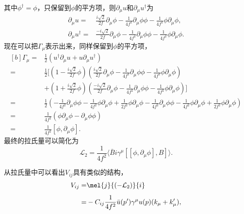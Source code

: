 其中$\phi^{\dagger}=\phi$，只保留到$\phi$的平方项，则$\partial_{\mu}u$和$\partial_{\mu}u^{\dagger}$为
\begin{equation}
\begin{split}
	\partial_{\mu}u=&\frac{i\sqrt{2}}{2f}\partial_{\mu}\phi-\frac{1}{4f^2}\partial_{\mu}\phi\phi-\frac{1}{4f^2}\phi\partial_{\mu}\phi,\\[1ex]
	\partial_{\mu}u^{\dagger}=&\frac{-i\sqrt{2}}{2f}\partial_{\mu}\phi-\frac{1}{4f^2}\partial_{\mu}\phi\phi-\frac{1}{4f^2}\phi\partial_{\mu}\phi.
\end{split}
\end{equation}
现在可以把$\Gamma_{\mu}$表示出来，同样保留到$\phi$的平方项，\vspace{-0.5cm}
\begin{equation}
\begin{aligned}[b]
	\Gamma_{\mu}=&\frac{1}{2}(u^{\dagger}\partial_{\mu}u+u\partial_{\mu}u^{\dagger})\\
	=&\frac{1}{2}[(1-\frac{i\sqrt{2}}{2f}\phi)(\frac{i\sqrt{2}}{2f}\partial_{\mu}\phi-\frac{1}{4f^2}\partial_{\mu}\phi\phi-\frac{1}{4f^2}\phi\partial_{\mu}\phi)\\[1ex]
	 &+(1+\frac{i\sqrt{2}}{2f}\phi)(\frac{-i\sqrt{2}}{2f}\partial_{\mu}\phi-\frac{1}{4f^2}\partial_{\mu}\phi\phi-\frac{1}{4f^2}\phi\partial_{\mu}\phi)]\\[1ex]
	=&\frac{1}{2}(-\frac{1}{4f^2}\partial_{\mu}\phi\phi-\frac{1}{4f^2}\phi\partial_{\mu}\phi+\frac{1}{2f^2}\phi\partial_{\mu}\phi-\frac{1}{4f^2}\partial_{\mu}\phi\phi-\frac{1}{4f^2}\phi\partial_{\mu}\phi+\frac{1}{2f^2}\phi\partial_{\mu}\phi)\\[1ex]
	=&\frac{1}{4f^2}(\phi\partial_{\mu}\phi-\partial_{\mu}\phi\phi)\\
	=&\frac{1}{4f^2}[\phi,\partial_{\mu}\phi].
\end{aligned}
\end{equation}
最终的拉氏量可以简化为
\begin{equation}
	\label{eql2}
	\mathcal{L}_{2}=\frac{1}{4f^2}\langle\bar{B}i\gamma^{\mu}[[\phi,\partial_{\mu}\phi],B]\rangle.
\end{equation}\par
从拉氏量中可以看出$V_{ij}$具有类似的结构，
\begin{equation}
\begin{split}
	V_{ij}=&\mel{j}{(\mathcal{-L}_{2})}{i}\\[1ex]
	=&-C_{ij}\frac{1}{4f^2}\bar{u}(p')\gamma^{\mu}u(p)(k_{\mu}+k'_{\mu}),
\end{split}
\end{equation}
